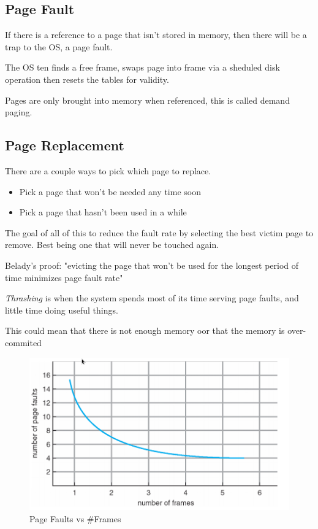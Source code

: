 \documentclass{article}
\begin{document}
\subsection{Page Fault}
If there is a reference to a page that isn't stored in memory, then there will be a trap to the OS, a page fault.

The OS ten finds a free frame, swaps page into frame via a sheduled disk operation then resets the tables for validity.

Pages are only brought into memory when referenced, this is called demand paging.

\subsection{Page Replacement}
There are a couple ways to pick which page to replace.
\begin{itemize}
    \item Pick a page that won't be needed any time soon
    \item Pick a page that hasn't been used in a while
\end{itemize}

The goal of all of this to reduce the fault rate by selecting the best victim page to remove.
Best being one that will never be touched again.

Belady's proof:
"evicting the page that won’t be used for the longest period of time minimizes page fault rate"

\emph{Thrashing} is when the system spends most of its time serving page faults, and little time doing useful things.

This could mean that there is not enough memory oor that the memory is over-commited


\begin{figure}[H]
  \centering
  \includegraphics[scale=0.35]{pageFaultGraph.png}
  \caption{Page Faults vs \#Frames}
\end{figure}
\end{document}
